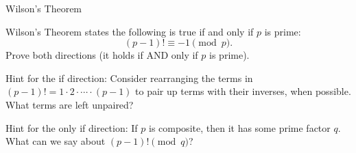 \begin{homeworkProblem}{Wilson's Theorem}

    Wilson's Theorem states the following is true if and only if $p$ is prime:
    \[(p - 1)! \equiv -1 \pmod{p}.\]
    Prove both directions (it holds if AND only if $p$ is prime).

    Hint for the if direction: Consider rearranging the terms in $(p - 1)! = 1 \cdot 2 \cdot \cdots \cdot (p - 1)$ to pair up terms with their inverses, when possible. What terms are left unpaired?

    Hint for the only if direction: If $p$ is composite, then it has some prime factor $q$.  What can we say about $(p-1)! \pmod{q}$?
    
\end{homeworkProblem}